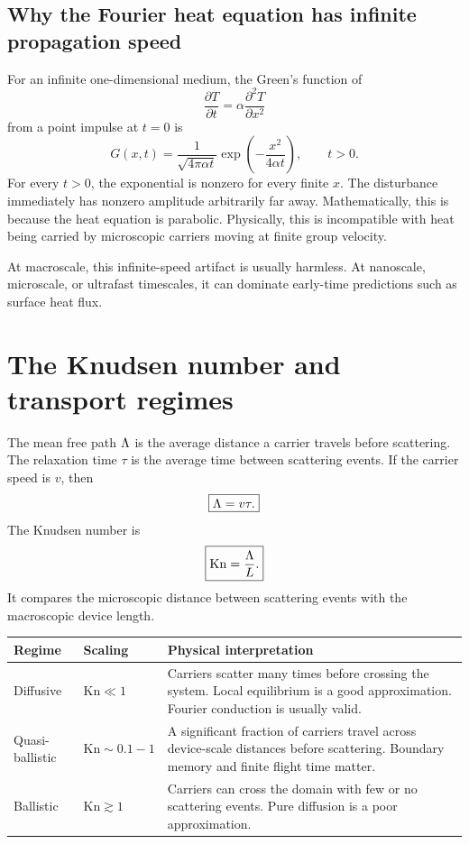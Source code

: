 \documentclass[11pt]{article}
\begin{document}
\subsection{Why the Fourier heat equation has infinite propagation speed}
For an infinite one-dimensional medium, the Green's function of
\begin{equation}
    \frac{\partial T}{\partial t}=\alpha\frac{\partial^2T}{\partial x^2}
\end{equation}
from a point impulse at \(t=0\) is
\begin{equation}
    G(x,t)=\frac{1}{\sqrt{4\pi\alpha t}}\exp\left(-\frac{x^2}{4\alpha t}\right), \qquad t>0.
\end{equation}
For every \(t>0\), the exponential is nonzero for every finite \(x\). The disturbance immediately has nonzero amplitude arbitrarily far away. Mathematically, this is because the heat equation is parabolic. Physically, this is incompatible with heat being carried by microscopic carriers moving at finite group velocity.

At macroscale, this infinite-speed artifact is usually harmless. At nanoscale, microscale, or ultrafast timescales, it can dominate early-time predictions such as surface heat flux.

\section{The Knudsen number and transport regimes}
The mean free path \(\Lambda\) is the average distance a carrier travels before scattering. The relaxation time \(\tau\) is the average time between scattering events. If the carrier speed is \(v\), then
\begin{equation}
    \boxed{\Lambda=v\tau.}
    \label{eq:mfp_def}
\end{equation}
The Knudsen number is
\begin{equation}
    \boxed{\mathrm{Kn}=\frac{\Lambda}{L}.}
    \label{eq:kn_def}
\end{equation}
It compares the microscopic distance between scattering events with the macroscopic device length.

\begin{center}
\begin{tabularx}{0.95\textwidth}{>{\RaggedRight\arraybackslash}p{}>{\RaggedRight\arraybackslash}p{}>{\RaggedRight\arraybackslash}X}
\toprule
Regime & Scaling & Physical interpretation \\
\midrule
Diffusive & \(\mathrm{Kn}\ll 1\) & Carriers scatter many times before crossing the system. Local equilibrium is a good approximation. Fourier conduction is usually valid. \\
Quasi-ballistic & \(\mathrm{Kn}\sim 0.1-1\) & A significant fraction of carriers travel across device-scale distances before scattering. Boundary memory and finite flight time matter. \\
Ballistic & \(\mathrm{Kn}\gtrsim 1\) & Carriers can cross the domain with few or no scattering events. Pure diffusion is a poor approximation. \\
\bottomrule
\end{tabularx}
\end{center}
\end{document}
